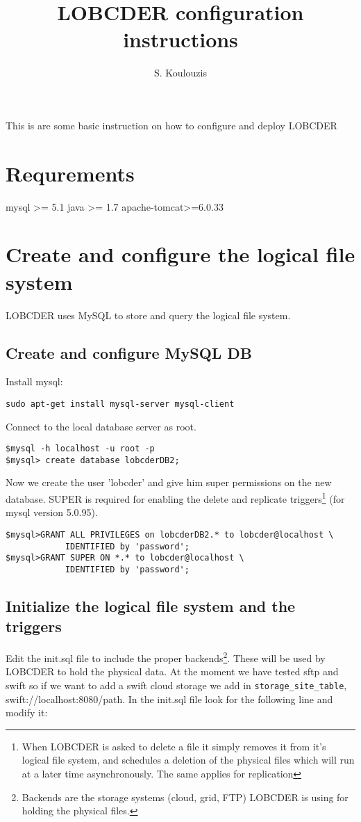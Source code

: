 \documentclass[a4paper,10pt]{article}
\title{LOBCDER configuration instructions}
\author{S. Koulouzis}
\date{}
\begin{document}
\maketitle
This is are some basic instruction on how to configure and deploy LOBCDER 

\section{Requrements}
mysql >= 5.1
java >= 1.7
apache-tomcat>=6.0.33


\section{Create and configure the logical file system}
LOBCDER uses MySQL to store and query the logical file system.

\subsection{Create and configure MySQL DB}
Install mysql: 
\begin{lstlisting}
sudo apt-get install mysql-server mysql-client
\end{lstlisting}


Connect to the local database server as root.
\begin{lstlisting}
$mysql -h localhost -u root -p
$mysql> create database lobcderDB2;
\end{lstlisting}


Now we create the user 'lobcder' and give him super permissions on the new database. SUPER is required for 
enabling the delete and replicate triggers\footnote{When LOBCDER is asked to delete a file it simply removes it 
from it's logical file system, and schedules a deletion of the physical files which will run at a later time 
asynchronously. The same applies for replication} (for mysql version 5.0.95). 
\begin{lstlisting}
$mysql>GRANT ALL PRIVILEGES on lobcderDB2.* to lobcder@localhost \ 
			IDENTIFIED by 'password';
$mysql>GRANT SUPER ON *.* to lobcder@localhost \
			IDENTIFIED by 'password';
\end{lstlisting}


\subsection{Initialize the logical file system and the triggers}
Edit the init.sql file to include the proper backends\footnote{Backends are the storage systems 
(cloud, grid, FTP) LOBCDER is using for holding the physical files.}. 
These will be used by LOBCDER to hold the physical data. At the moment we have tested sftp and swift so if we want 
to add a swift cloud storage we add in \texttt{storage\_site\_table}, swift://localhost:8080/path. In the 
init.sql file look for the following line and modify it: 
\end{document}

